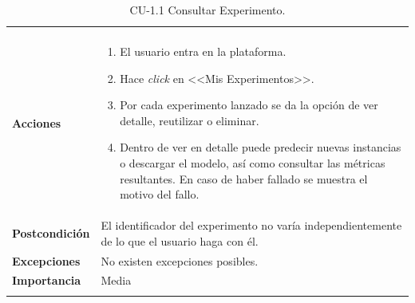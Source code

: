 \begin{longtable}[H]{@{}ll@{}}
\begin{minipage}[t]{0.71\columnwidth}
\begin{itemize}
\end{itemize}\strut
\end{minipage}\tabularnewline
\begin{minipage}[t]{0.23\columnwidth}\raggedright\strut
\textbf{Acciones}\strut
\end{minipage} & \begin{minipage}[t]{0.71\columnwidth}\raggedright\strut
\begin{enumerate}
\def\labelenumi{\arabic{enumi}.}
\tightlist
\item El usuario entra en la plataforma.
\item Hace \textit{click} en <<Mis Experimentos>>.
\item Por cada experimento lanzado se da la opción de ver detalle, reutilizar o eliminar.
\item Dentro de ver en detalle puede predecir nuevas instancias o descargar el modelo, así como consultar las métricas resultantes. En caso de haber fallado se muestra el motivo del fallo.
\end{enumerate}\strut
\end{minipage}\tabularnewline
\begin{minipage}[t]{0.23\columnwidth}\raggedright\strut
\textbf{Postcondición}\strut
\end{minipage} & \begin{minipage}[t]{0.71\columnwidth}\raggedright\strut
El identificador del experimento no varía independientemente de lo que el usuario haga con él.\strut
\end{minipage}\tabularnewline
\begin{minipage}[t]{0.23\columnwidth}\raggedright\strut
\textbf{Excepciones}\strut
\end{minipage} & \begin{minipage}[t]{0.71\columnwidth}\raggedright\strut
No existen excepciones posibles.\strut
\end{minipage}\tabularnewline
\begin{minipage}[t]{0.23\columnwidth}\raggedright\strut
\textbf{Importancia}\strut
\end{minipage} & \begin{minipage}[t]{0.71\columnwidth}\raggedright\strut
Media\strut
\end{minipage}\tabularnewline
\bottomrule
\caption{CU-1.1 Consultar Experimento.}
\end{longtable}

